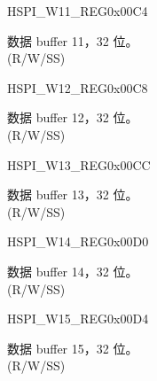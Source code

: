 \begin{register}{H}{SPI\_W11\_REG}{0x00C4}\label{regdesc:SPI3W11REG}
%
\regnewline%
\begin{regdesc}\begin{reglist}
\label{fielddesc:SPI3BUF11}\item [SPI\_BUF11] 数据 buffer 11，32 位。\\
(R/W/SS)
\end{reglist}\end{regdesc}
\end{register}


\begin{register}{H}{SPI\_W12\_REG}{0x00C8}\label{regdesc:SPI3W12REG}
%
\regnewline%
\begin{regdesc}\begin{reglist}
\label{fielddesc:SPI3BUF12}\item [SPI\_BUF12] 数据 buffer 12，32 位。\\
(R/W/SS)
\end{reglist}\end{regdesc}
\end{register}


\begin{register}{H}{SPI\_W13\_REG}{0x00CC}\label{regdesc:SPI3W13REG}
%
\regnewline%
\begin{regdesc}\begin{reglist}
\label{fielddesc:SPI3BUF13}\item [SPI\_BUF13] 数据 buffer 13，32 位。\\
(R/W/SS)
\end{reglist}\end{regdesc}
\end{register}


\begin{register}{H}{SPI\_W14\_REG}{0x00D0}\label{regdesc:SPI3W14REG}
%
\regnewline%
\begin{regdesc}\begin{reglist}
\label{fielddesc:SPI3BUF14}\item [SPI\_BUF14] 数据 buffer 14，32 位。\\
(R/W/SS)
\end{reglist}\end{regdesc}
\end{register}


\begin{register}{H}{SPI\_W15\_REG}{0x00D4}\label{regdesc:SPI3W15REG}
%
\regnewline%
\begin{regdesc}\begin{reglist}
\label{fielddesc:SPI3BUF15}\item [SPI\_BUF15] 数据 buffer 15，32 位。\\
(R/W/SS)
\end{reglist}\end{regdesc}
\end{register}



